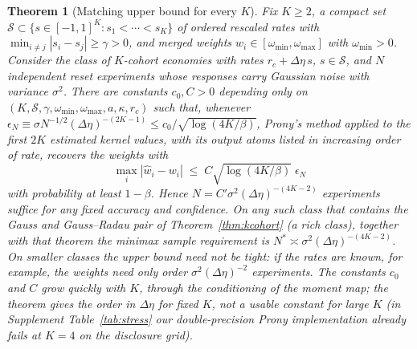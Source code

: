 \documentclass[12pt]{article}
\newtheorem{theorem}{Theorem}[section]
\theoremstyle{definition}
\theoremstyle{remark}
\begin{document}
\begin{theorem}[Matching upper bound for every $K$]\label{prop:esprit}
Fix $K\ge2$, a compact set $\mathcal S\subset\{s\in[-1,1]^K:s_1<\cdots<s_K\}$ of ordered rescaled rates with $\min_{i\ne j}|s_i-s_j|\ge\gamma>0$, and merged weights $w_i\in[\omega_{\min},\omega_{\max}]$ with $\omega_{\min}>0$. Consider the class of $K$-cohort economies with rates $r_c+\Delta\eta\,s$, $s\in\mathcal S$, and $N$ independent reset experiments whose responses carry Gaussian noise with variance $\sigma^2$. There are constants $c_0,C>0$ depending only on $(K,\mathcal S,\gamma,\omega_{\min},\omega_{\max},a,\kappa,r_c)$ such that, whenever $\epsilon_N\equiv\sigma N^{-1/2}(\Delta\eta)^{-(2K-1)}\le c_0/\sqrt{\log(4K/\beta)}$, Prony's method applied to the first $2K$ estimated kernel values, with its output atoms listed in increasing order of rate, recovers the weights with
\[
\max_i|\hat w_i-w_i|\;\le\;C\sqrt{\log(4K/\beta)}\;\epsilon_N
\]
with probability at least $1-\beta$. Hence $N=C'\sigma^2(\Delta\eta)^{-(4K-2)}$ experiments suffice for any fixed accuracy and confidence. On any such class that contains the Gauss and Gauss--Radau pair of Theorem~\ref{thm:kcohort} (a rich class), together with that theorem the minimax sample requirement is $N^*\asymp\sigma^2(\Delta\eta)^{-(4K-2)}$. On smaller classes the upper bound need not be tight: if the rates are known, for example, the weights need only order $\sigma^2(\Delta\eta)^{-2}$ experiments. The constants $c_0$ and $C$ grow quickly with $K$, through the conditioning of the moment map; the theorem gives the order in $\Delta\eta$ for fixed $K$, not a usable constant for large $K$ (in Supplement Table~\ref{tab:stress} our double-precision Prony implementation already fails at $K=4$ on the disclosure grid).
\end{theorem}
\end{document}
